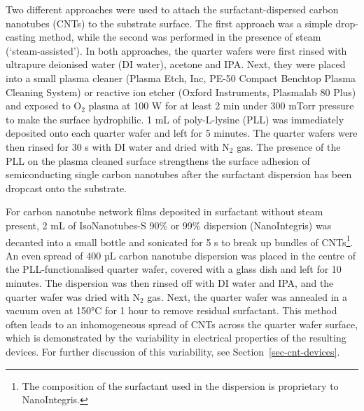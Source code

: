 \documentclass[
  a4paper,
]{scrbook}
\begin{document}
Two different approaches were used to attach the surfactant-dispersed
carbon nanotubes (CNTs) to the substrate surface. The first approach was
a simple drop-casting method, while the second was performed in the
presence of steam (`steam-assisted'). In both approaches, the quarter
wafers were first rinsed with ultrapure deionised water (DI water),
acetone and IPA. Next, they were placed into a small plasma cleaner
(Plasma Etch, Inc, PE-50 Compact Benchtop Plasma Cleaning System) or
reactive ion etcher (Oxford Instruments, Plasmalab 80 Plus) and exposed
to O\(_2\) plasma at 100 W for at least 2 min under 300 mTorr pressure
to make the surface hydrophilic. 1 mL of poly-L-lysine (PLL) was
immediately deposited onto each quarter wafer and left for 5 minutes.
The quarter wafers were then rinsed for 30 s with DI water and dried
with N\(_2\) gas. The presence of the PLL on the plasma cleaned surface
strengthens the surface adhesion of semiconducting single carbon
nanotubes after the surfactant dispersion has been dropcast onto the
substrate.

For carbon nanotube network films deposited in surfactant without steam
present, 2 mL of IsoNanotubes-S 90\% or 99\% dispersion (NanoIntegris)
was decanted into a small bottle and sonicated for 5 s to break up
bundles of CNTs\footnote{The composition of the surfactant used in the
  dispersion is proprietary to NanoIntegris.}. An even spread of 400 µL
carbon nanotube dispersion was placed in the centre of the
PLL-functionalised quarter wafer, covered with a glass dish and left for
10 minutes. The dispersion was then rinsed off with DI water and IPA,
and the quarter wafer was dried with N\(_2\) gas. Next, the quarter
wafer was annealed in a vacuum oven at 150°C for 1 hour to remove
residual surfactant. This method often leads to an inhomogeneous spread
of CNTs across the quarter wafer surface, which is demonstrated by the
variability in electrical properties of the resulting devices. For
further discussion of this variability, see
Section~\ref{sec-cnt-devices}.
\end{document}
